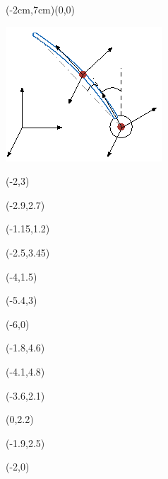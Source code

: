 \documentclass{article}
\begin{document}
\small

\begin{psdraw}(-2cm,7cm)(0,0)

\includegraphics[width=0.5\linewidth]{rotary_flexible_beam}


\move(-2,3)

\move(-2.9,2.7)

\move(-1.15,1.2)

\move(-2.5,3.45)

\move(-4,1.5)

\move(-5.4,3)

\move(-6,0)

\move(-1.8,4.6)

\move(-4.1,4.8)

\move(-3.6,2.1)

\move(0,2.2)

\move(-1.9,2.5)

\move(-2,0)

\end{psdraw}
\end{document}
